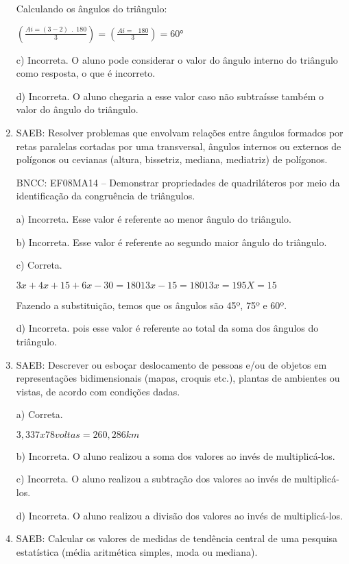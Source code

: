 \begin{enumerate}
Calculando os ângulos do triângulo:

$(\frac{Ai = \left( 3 - 2 \right)\ \ .\ \ 180}{3}) =

(\frac{Ai = \ \ \ 180}{3}) = 60°$

c) Incorreta. O aluno pode considerar o valor do ângulo interno do
triângulo como resposta, o que é incorreto.

d) Incorreta. O aluno chegaria a esse valor caso não subtraísse
também o valor do ângulo do triângulo.

\item SAEB: Resolver problemas que envolvam relações entre ângulos formados
por retas paralelas cortadas por uma transversal, ângulos internos ou
externos de polígonos ou cevianas (altura, bissetriz, mediana,
mediatriz) de polígonos.

BNCC: EF08MA14 -- Demonstrar propriedades de quadriláteros por meio da
identificação da congruência de triângulos.

a) Incorreta. Esse valor é referente ao menor ângulo do triângulo.

b) Incorreta. Esse valor é referente ao segundo maior ângulo do
triângulo.

c) Correta.

$3x + 4x + 15 + 6x - 30 = 180

13x - 15 = 180

13x = 195

X = 15$

Fazendo a substituição, temos que os ângulos são 45º, 75º e 60º.

d) Incorreta. pois esse valor é referente ao total da soma dos ângulos
do triângulo.

\item SAEB: Descrever ou esboçar deslocamento de pessoas e/ou de objetos em
representações bidimensionais (mapas, croquis etc.), plantas de
ambientes ou vistas, de acordo com condições dadas.

a) Correta.

$3,337 x 78 voltas = 260,286 km$

b) Incorreta. O aluno realizou a soma dos valores ao invés de
multiplicá-los.

c) Incorreta. O aluno realizou a subtração dos valores ao invés de
multiplicá-los.

d) Incorreta. O aluno realizou a divisão dos valores ao invés
de multiplicá-los.

\item SAEB: Calcular os valores de medidas de tendência central de uma
pesquisa estatística (média aritmética simples, moda ou mediana).


\end{enumerate}
